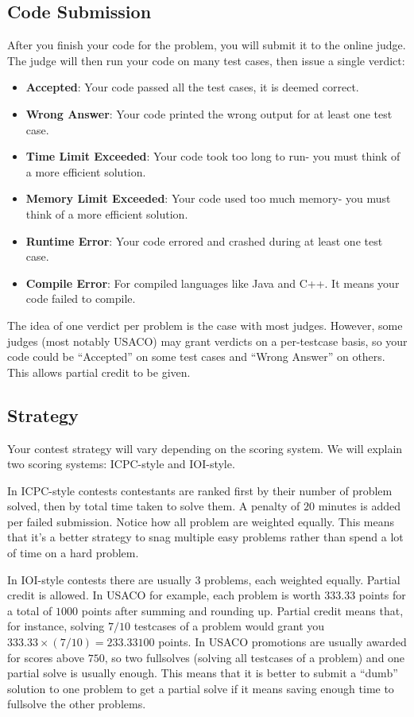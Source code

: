 \documentclass{article}
\begin{document}
\subsection{Code Submission}
After you finish your code for the problem, you will submit it to the online judge. The judge will then run your code on many test cases, then issue a single verdict:
\begin{itemize}
    \item \textbf{Accepted}: Your code passed all the test cases, it is deemed correct.
    \item \textbf{Wrong Answer}: Your code printed the wrong output for at least one test case.
    \item \textbf{Time Limit Exceeded}: Your code took too long to run- you must think of a more efficient solution.
    \item \textbf{Memory Limit Exceeded}: Your code used too much memory- you must think of a more efficient solution.
    \item \textbf{Runtime Error}: Your code errored and crashed during at least one test case.
    \item \textbf{Compile Error}: For compiled languages like Java and C++. It means your code failed to compile.
\end{itemize}
The idea of one verdict per problem is the case with most judges. However, some judges (most notably USACO) may grant verdicts on a per-testcase basis, so your code could be ``Accepted'' on some test cases and ``Wrong Answer'' on others. This allows partial credit to be given.

\subsection {Strategy}

Your contest strategy will vary depending on the scoring system. We will explain two scoring systems: ICPC-style and IOI-style.

In ICPC-style contests contestants are ranked first by their number of problem solved, then by total time taken to solve them. A penalty of $20$ minutes is added per failed submission. Notice how all problem are weighted equally. This means that it's a better strategy to snag multiple easy problems rather than spend a lot of time on a hard problem.

In IOI-style contests there are usually 3 problems, each weighted equally. Partial credit is allowed. In USACO for example, each problem is worth $333.33$ points for a total of $1000$ points after summing and rounding up. Partial credit means that, for instance, solving $7/10$ testcases of a problem would grant you $333.33\times (7/10) = 233.33100$ points. In USACO promotions are usually awarded for scores above $750$, so two fullsolves (solving all testcases of a problem) and one partial solve is usually enough. This means that it is better to submit a ``dumb'' solution to one problem to get a partial solve if it means saving enough time to fullsolve the other problems.
\end{document}
